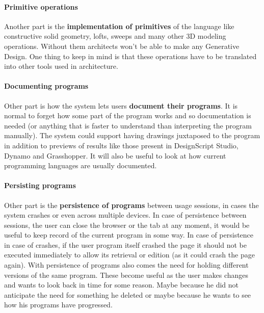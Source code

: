 \documentclass{./llncs2e/llncs}
\begin{document}
	\paragraph{Primitive operations}
	Another part is the \textbf{implementation of primitives} of the language like constructive solid geometry, lofts, sweeps and many other 3D modeling operations.
	Without them architects won't be able to make any Generative Design.
	One thing to keep in mind is that these operations have to be translated into other tools used in architecture.

	\paragraph{Documenting programs}
	Other part is how the system lets users \textbf{document their programs}. 
	It is normal to forget how some part of the program works and so documentation is needed (or anything that is faster to understand than interpreting the program manually).
	The system could support having drawings juxtaposed to the program in addition to previews of results like those present in DesignScript Studio, Dynamo and Grasshopper. 
	It will also be useful to look at how current programming languages are usually documented. 

	\paragraph{Persisting programs}
	Other part is the \textbf{persistence of programs} between usage sessions, in cases the system crashes or even across multiple devices.
	In case of persistence between sessions, the user can close the browser or the tab at any moment, it would be useful to keep record of the current program in some way. 
	In case of persistence in case of crashes, if the user program itself crashed the page it should not be executed immediately to allow its retrieval or edition (as it could crash the page again). 
	With persistence of programs also comes the need for holding different versions of the same program. 
	These become useful as the user makes changes and wants to look back in time for some reason. 
	Maybe because he did not anticipate the need for something he deleted or maybe because he wants to see how his programs have progressed.
\end{document}
